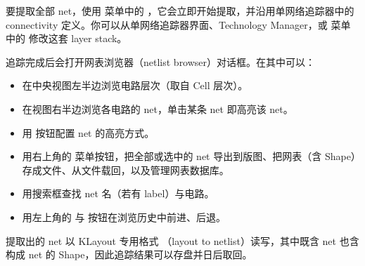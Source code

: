 要提取全部 net，使用  菜单中的 ，它会立即开始提取，并沿用单网络追踪器中的 connectivity 定义。你可以从单网络追踪器界面、Technology Manager，或  菜单中的  修改这套 layer stack。

追踪完成后会打开网表浏览器（netlist browser）对话框。在其中可以：

\begin{itemize}
\item 在中央视图左半边浏览电路层次（取自 Cell 层次）。
\item 在视图右半边浏览各电路的 net，单击某条 net 即高亮该 net。
\item 用  按钮配置 net 的高亮方式。
\item 用右上角的  菜单按钮，把全部或选中的 net 导出到版图、把网表（含 Shape）存成文件、从文件载回，以及管理网表数据库。
\item 用搜索框查找 net 名（若有 label）与电路。
\item 用左上角的  与  按钮在浏览历史中前进、后退。
\end{itemize}

提取出的 net 以 KLayout 专用格式 （layout to netlist）读写，其中既含 net 也含构成 net 的 Shape，因此追踪结果可以存盘并日后取回。
